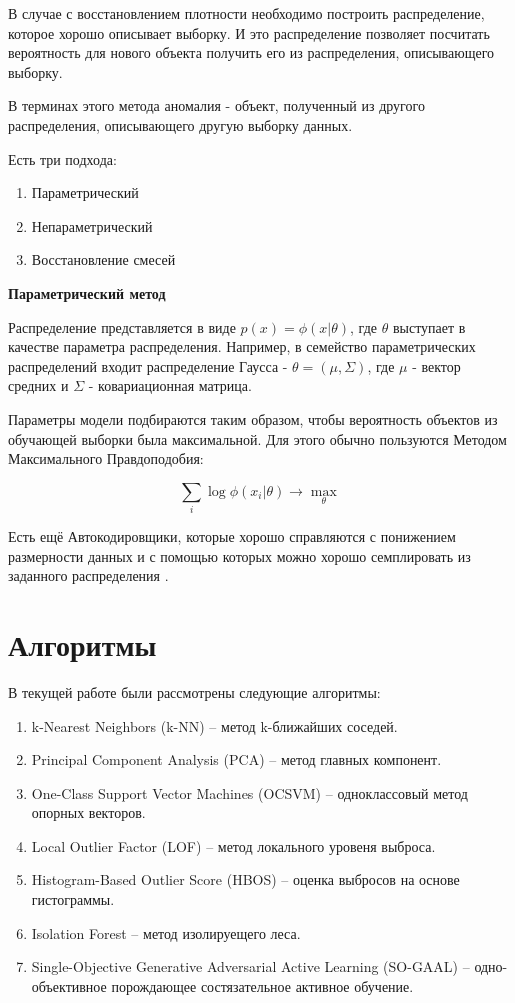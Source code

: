 В случае с восстановлением плотности необходимо построить распределение, которое хорошо описывает выборку. И это распределение позволяет посчитать вероятность для нового объекта получить его из распределения, описывающего выборку.

В терминах этого метода аномалия - объект, полученный из другого распределения, описывающего другую выборку данных.

\noindent Есть три подхода:
\begin{enumerate}
  \item Параметрический
  \item Непараметрический
  \item Восстановление смесей
\end{enumerate}

\noindent\textbf{Параметрический метод}

Распределение представляется в виде $p(x)=\phi(x\vert\theta)$, где $\theta$ выступает в качестве параметра распределения. Например, в семейство параметрических распределений входит распределение Гаусса - $\theta=(\mu, \Sigma)$, где $\mu$ - вектор средних и $\Sigma$ - ковариационная матрица.

Параметры модели подбираются таким образом, чтобы вероятность объектов из обучающей выборки была максимальной. Для этого обычно пользуются Методом Максимального Правдоподобия:

\[ \sum_{i}\log\phi(x_{i}\vert\theta) \rightarrow \max_{\theta} \]

Есть ещё Автокодировщики, которые хорошо справляются с понижением размерности данных и с помощью которых можно хорошо семплировать из заданного распределения \cite{karazeev}.

\section{Алгоритмы} \label{sec:ch2/sec4}

\noindent В текущей работе были рассмотрены следующие алгоритмы:

\begin{enumerate}
	\item k-Nearest Neighbors (k-NN) \cite{knn} -- метод k-ближайших соседей.
	\item Principal Component Analysis (PCA) \cite{pca} -- метод главных компонент.
	\item One-Class Support Vector Machines (OCSVM) \cite{ocsvm} -- одноклассовый метод опорных векторов.
	\item Local Outlier Factor (LOF) \cite{lof} -- метод локального уровеня выброса.
	\item Histogram-Based Outlier Score (HBOS) \cite{hbos} -- оценка выбросов на основе гистограммы.
	\item Isolation Forest \cite{iforest} -- метод изолируещего леса.
	\item Single-Objective Generative Adversarial Active Learning (SO-GAAL) \cite{gaal} -- одно-объективное порождающее состязательное активное обучение.
\end{enumerate}

